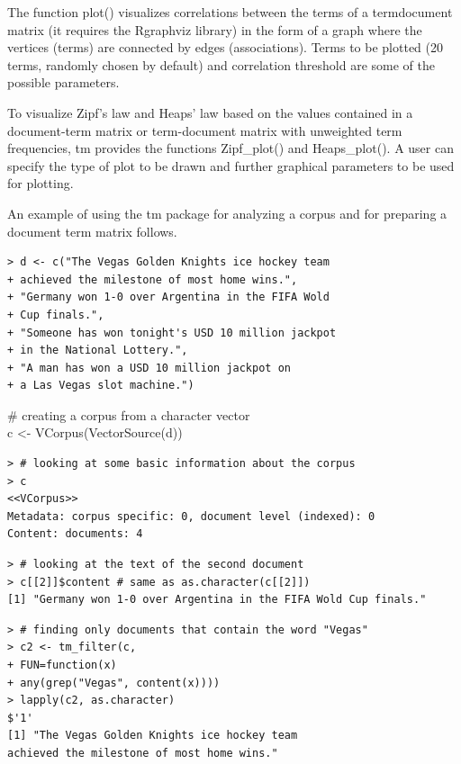 \documentclass[11pt,openany,executivepaper]{book}
\begin{document}
The function plot() visualizes correlations between the terms of a termdocument matrix (it requires the Rgraphviz library) in the form of a graph where the vertices (terms) are connected by edges (associations). Terms to be plotted (20 terms, randomly chosen by default) and correlation threshold are some of the possible parameters.

To visualize Zipf's law and Heaps' law based on the values contained in a document-term matrix or term-document matrix with unweighted term frequencies, tm provides the functions Zipf\_plot() and Heaps\_plot(). A user can specify the type of plot to be drawn and further graphical parameters to be used for plotting.

An example of using the tm package for analyzing a corpus and for preparing a document term matrix follows.

\begin{verbatim}
> d <- c("The Vegas Golden Knights ice hockey team
+ achieved the milestone of most home wins.",
+ "Germany won 1-0 over Argentina in the FIFA Wold
+ Cup finals.",
+ "Someone has won tonight's USD 10 million jackpot
+ in the National Lottery.",
+ "A man has won a USD 10 million jackpot on
+ a Las Vegas slot machine.")
\end{verbatim}

\begin{displayquote}
\# creating a corpus from a character vector\\
c <- VCorpus(VectorSource(d))
\end{displayquote}

\begin{verbatim}
> # looking at some basic information about the corpus
> c
<<VCorpus>>
Metadata: corpus specific: 0, document level (indexed): 0
Content: documents: 4
\end{verbatim}

\begin{verbatim}
> # looking at the text of the second document
> c[[2]]$content # same as as.character(c[[2]])
[1] "Germany won 1-0 over Argentina in the FIFA Wold Cup finals."
\end{verbatim}

\begin{verbatim}
> # finding only documents that contain the word "Vegas"
> c2 <- tm_filter(c,
+ FUN=function(x)
+ any(grep("Vegas", content(x))))
> lapply(c2, as.character)
$'1'
[1] "The Vegas Golden Knights ice hockey team 
achieved the milestone of most home wins."
\end{verbatim}
\end{document}
